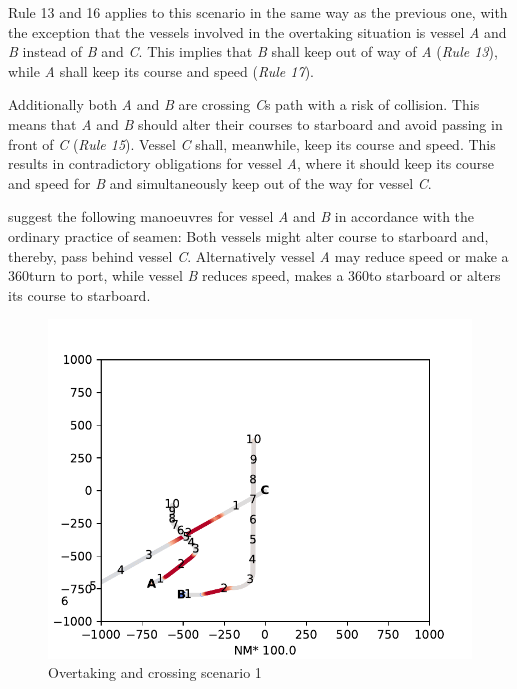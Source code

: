 Rule 13 and 16 applies to this scenario in the same way as the previous one, with the exception that the vessels involved in the overtaking situation is vessel \textit{A} and \textit{B} instead of \textit{B} and \textit{C}. This implies that \textit{B} shall keep out of way of \textit{A} (\textit{Rule 13}), while \textit{A} shall keep its course and speed (\textit{Rule 17}).

Additionally both \textit{A} and \textit{B} are crossing \textit{C}s path with a risk of collision. This means that \textit{A} and \textit{B} should alter their courses to starboard and avoid passing in front of \textit{C} (\textit{Rule 15}). Vessel \textit{C} shall, meanwhile, keep its course and speed. This results in contradictory obligations for vessel  \textit{A}, where it should keep its course and speed for \textit{B} and simultaneously keep out of the way for vessel \textit{C}.

\textcite{ecolreg_overtaking-and-crossing} suggest the following manoeuvres for vessel \textit{A} and \textit{B} in accordance with the ordinary practice of seamen:
Both vessels might alter course to starboard and, thereby, pass behind vessel \textit{C}. Alternatively vessel \textit{A} may reduce speed or make a 360\textdegree turn to port, while vessel \textit{B} reduces speed, makes a 360\textdegree to starboard or alters its course to starboard.

\begin{figure}[h]
    \centering
    \includegraphics[width=\textwidth,height=0.75\textheight,keepaspectratio]{Figures/Scenario/overtaking-and-crossing-res.pdf}
    \caption{Overtaking and crossing scenario 1}
    \label{fig:overtaking-and-crossing-res}
\end{figure}
